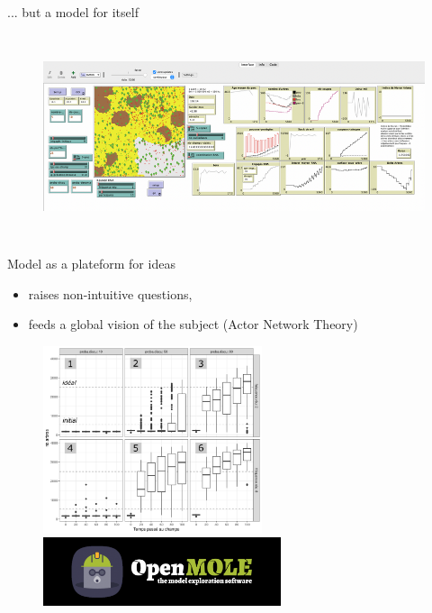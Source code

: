 \documentclass[aspectratio=169]{beamer}
\begin{document}
\begin{frame}{... but a model for itself}
    \begin{center}
        \vspace{-1em}
        \begin{figure}
            \centering
            \includegraphics[height = 6cm]{img/ideModele.png}
        \end{figure}
    \end{center}
\end{frame}

\begin{frame}{Model as a plateform for ideas }
    \begin{center}
        \vspace{-1em}

        \begin{itemize}
            \item raises non-intuitive questions,
            \item feeds a global vision of the subject (Actor Network Theory)
        \end{itemize}
        \begin{figure}
            \centering
            \includegraphics[height = 5.5cm]{img/boxplotReunionDiscussion.png}~
            \includegraphics[height = 2cm]{img/OpenMOLE-Banner.png}
        \end{figure}
    \end{center}
\end{frame}
\end{document}
